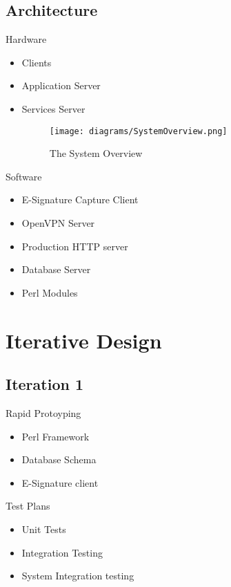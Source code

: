 \documentclass{beamer}
\begin{document}
\subsection{Architecture}
\begin{frame}{Hardware}
\begin{itemize}
\item Clients
\item Application Server
\item Services Server
\begin{figure}[!h]
\texttt{[image: diagrams/SystemOverview.png]} \caption{ The System Overview } \label{fig:Users}
\end{figure}

\end{itemize}
\end{frame}
\begin{frame}{Software}
\begin{itemize}
\item E-Signature Capture Client
\item OpenVPN Server
\item Production HTTP server
\item Database Server
\item Perl Modules 
\end{itemize}
\end{frame}
\section{Iterative Design}

\subsection{Iteration 1}
\begin{frame}{Rapid Protoyping}
\begin{itemize}
\item Perl Framework
\item Database Schema
\item E-Signature client
\end{itemize}
\end{frame}

\begin{frame}{Test Plans}
\begin{itemize}
\item Unit Tests
\item Integration Testing
\item System Integration testing
\end{itemize}
\end{frame}
\end{document}
